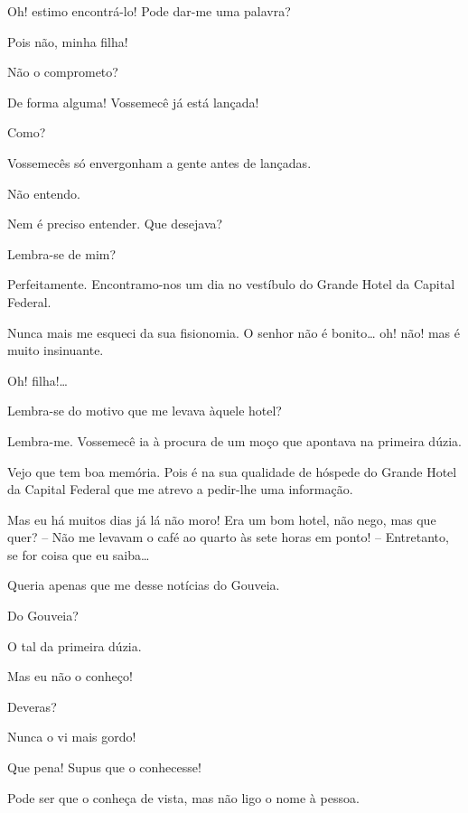 
 Oh! estimo encontrá-lo! Pode dar-me uma palavra?

 Pois não, minha filha!

 Não o comprometo?

 De forma alguma! Vossemecê já está lançada!

 Como?

 Vossemecês só envergonham a gente antes de lançadas.

 Não entendo.

 Nem é preciso entender. Que desejava?

 Lembra-se de mim?

 Perfeitamente. Encontramo-nos um dia no vestíbulo do Grande
Hotel da Capital Federal.

  Nunca mais me esqueci da sua fisionomia. O
senhor não é bonito\ldots{} oh! não! mas é muito insinuante.

  Oh! filha!\ldots{}

 Lembra-se do motivo que me levava àquele hotel?

 Lembra-me. Vossemecê ia à procura de um moço que apontava na
primeira dúzia.

 Vejo que tem boa memória. Pois é na sua qualidade de hóspede do
Grande Hotel da Capital Federal que me atrevo a pedir-lhe uma informação.

 Mas eu há muitos dias já lá não moro! Era um bom hotel, não
nego, mas que quer? -- Não me levavam o café ao quarto às sete horas em ponto! --
Entretanto, se for coisa que eu saiba\ldots{}

 Queria apenas que me desse notícias do Gouveia.

 Do Gouveia?

 O tal da primeira dúzia.

 Mas eu não o conheço!

 Deveras?

 Nunca o vi mais gordo!

 Que pena! Supus que o conhecesse!

 Pode ser que o conheça de vista, mas não ligo o nome à pessoa.

